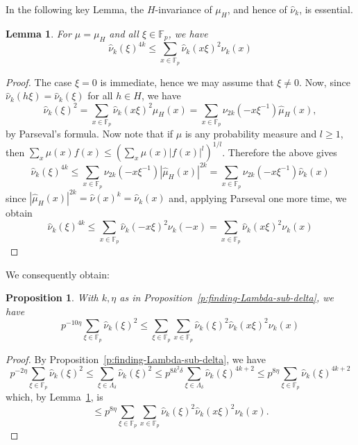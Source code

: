 \documentclass[11pt]{amsart}
\newtheorem{lem}[thm]{Lemma}
\newtheorem{prop}[thm]{Proposition}
\newcommand{\fp}{\mathbb{F}_p}
\newcommand{\muh}{{\mu_H}}
\newcommand{\nuhat}{{\widehat{\nu}}}
\newcommand{\muhat}{{\widehat{\mu}}}
\newcommand{\nuk}{{\nu_k}}
\begin{document}
In the following key Lemma, the $H$-invariance of $\muh$, and hence of
$\nuhat_k$, is essential.



\begin{lem}
\label{l:smear-out-lemma} For $\mu=\muh$ and all $\xi \in \fp$, we
have
$$
\nuhat_k(\xi)^{4k}
\leq
\sum_{x \in \fp}
\nuhat_k(x \xi)^2 \nuk(x)
$$
\end{lem}
\begin{proof}
The case $\xi=0$ is immediate, hence we may assume that $\xi \neq
0$. Now, since $\nuhat_k(h \xi)=\nuhat_k(\xi)$  for all $h\in H$, we
have
$$
\nuhat_k(\xi)^2 = \sum_{x \in \fp} \nuhat_k(x \xi)^2 \muh(x) =
\sum_{x \in \fp}  \nu_{2k}(- x \xi^{-1}) \muhat_H(x),
$$
by Parseval's formula. Now note that if $\mu$ is any probability
measure and $l \geq 1$, then $\sum_x \mu(x)f(x)\leq (\sum_x \mu(x)
|f(x)|^l)^{1/l}$. Therefore the above gives
$$
\nuhat_k(\xi)^{4k} \leq    \sum_{x \in \fp} \nu_{2k}(- x \xi^{-1})
|\muhat_H(x)|^{2k}  = \sum_{x \in \fp} \nu_{2k}(- x \xi^{-1})
\nuhat_k(x)
$$
since $|\muhat_H(x)|^{2k} = \nuhat(x)^k = \nuhat_k(x)$ and, applying
Parseval one more time, we obtain
$$
\nuhat_k(\xi)^{4k}
\leq
\sum_{x \in \fp} \nuhat_k(-x \xi)^2 \nu_k(-x)
=
\sum_{x \in \fp} \nuhat_k(x \xi)^2 \nu_k(x)
$$
\end{proof}

We consequently obtain:

\begin{prop}
\label{p:smearing-out} With $k,\eta$ as in
Proposition~\ref{p:finding-Lambda-sub-delta}, we have
$$
p^{-10\eta}\sum_{\xi \in \fp} \nuhat_k(\xi)^{2} \leq \sum_{\xi \in
\fp} \sum_{x \in \fp} \nuhat_k(\xi)^{2} \nuhat_k(x \xi)^2 \nuk(x)
$$
\end{prop}
\begin{proof}
By Proposition~\ref{p:finding-Lambda-sub-delta}, we have
$$
p^{-2\eta} \sum_{\xi \in \fp} \nuhat_k(\xi)^{2} \leq \sum_{\xi \in
\Lambda_\delta} \nuhat_k(\xi)^{2} \leq p^{8k^2\delta} \sum_{\xi
\in \Lambda_\delta} \nuhat_k(\xi)^{4k+2} \leq p^{8 \eta} \sum_{\xi
\in \fp} \nuhat_k(\xi)^{4k+2}
$$
which, by Lemma~\ref{l:smear-out-lemma}, is
$$
\leq p^{8 \eta} \sum_{\xi \in \fp} \sum_{x \in \fp}
\nuhat_k(\xi)^{2} \nuhat_k(x \xi)^2 \nuk(x).
$$
\end{proof}
\end{document}
